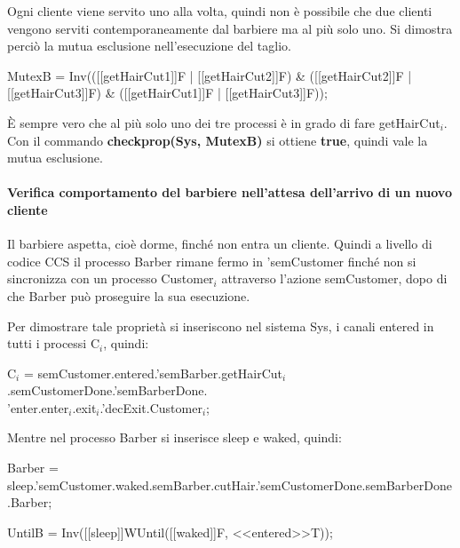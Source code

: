 Ogni cliente viene servito uno alla volta, quindi non è possibile che due clienti vengono serviti contemporaneamente dal barbiere ma al più solo uno. Si dimostra perciò la mutua esclusione nell'esecuzione del taglio.

\begin{center}
	\textsf{MutexB = Inv(([[getHairCut1]]F | [[getHairCut2]]F) \& ([[getHairCut2]]F | [[getHairCut3]]F) \& ([[getHairCut1]]F | [[getHairCut3]]F));}
\end{center}

È sempre vero che al più solo uno dei tre processi è in grado di fare \textsf{getHairCut$_{i}$}.\\
Con il commando \textbf{checkprop(Sys, MutexB)} si ottiene \textbf{true}, quindi vale la mutua esclusione.


\paragraph{Verifica comportamento del barbiere nell'attesa dell'arrivo di un nuovo cliente }\mbox{}

Il barbiere aspetta, cioè dorme, finché non entra un cliente. Quindi a livello di codice CCS il processo \textsf{Barber} rimane fermo in \textsf{'semCustomer} finché non si sincronizza con un processo \textsf{Customer$_{i}$} attraverso l'azione \textsf{semCustomer}, dopo di che \textsf{Barber} può proseguire la sua esecuzione.

Per dimostrare tale proprietà si inseriscono nel sistema \textsf{Sys}, i canali \textsf{entered} in tutti i processi \textsf{C$_{i}$}, quindi:

\textsf{C$_{i}$ = semCustomer.entered.'semBarber.getHairCut$_{i}$.semCustomerDone.'semBarberDone.}\\
\textsf{'enter.enter$_{i}$.exit$_{i}$.'decExit.Customer$_{i}$;}

Mentre nel processo \textsf{Barber} si inserisce \textsf{sleep} e \textsf{waked}, quindi:

\textsf{Barber = sleep.'semCustomer.waked.semBarber.cutHair.'semCustomerDone.semBarberDone.Barber;}

\begin{center}
	\textsf{UntilB = Inv([[sleep]]WUntil([[waked]]F, <<entered>>T));}
\end{center}

